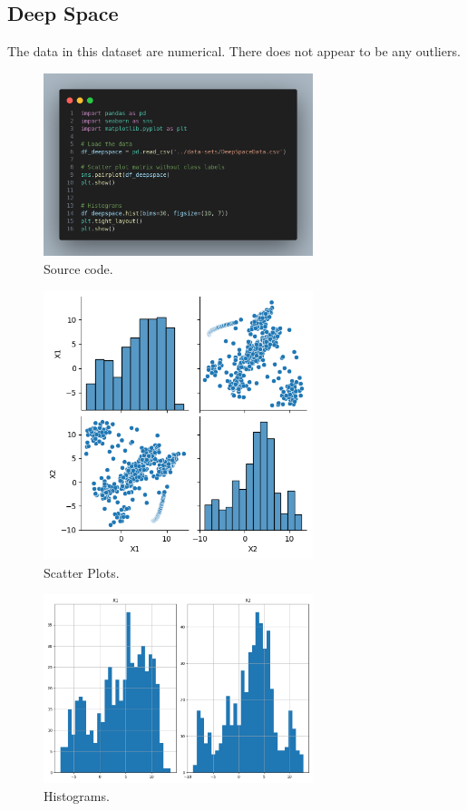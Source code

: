 \documentclass{article}
\begin{document}
		\subsection{Deep Space}

		The data in this dataset are numerical. There does not appear to be any outliers.

			\begin{figure}[H]
				\centering
				\includegraphics[width=0.7\textwidth]{deep-space-code.png}
				\caption{Source code.}
			\end{figure}
		
			\begin{figure}[H]
				\centering
				\includegraphics[width=0.7\textwidth]{deep-space-scatter.png}
				\caption{Scatter Plots.}
			\end{figure}

			\begin{figure}[H]
				\centering
				\includegraphics[width=0.7\textwidth]{deep-space-hist.png}
				\caption{Histograms.}
			\end{figure}
\end{document}
